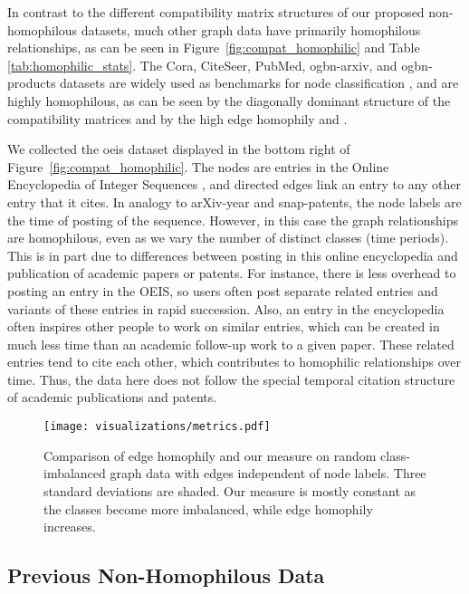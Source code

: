 \documentclass[sigconf, balance=false]{acmart}
\begin{document}
In contrast to the different compatibility matrix structures of our proposed non-homophilous datasets, much other graph data have primarily homophilous relationships, as can be seen in Figure~\ref{fig:compat_homophilic} and Table \ref{tab:homophilic_stats}. The Cora, CiteSeer, PubMed, ogbn-arxiv, and ogbn-products datasets are widely used as benchmarks for node classification \cite{yang2016revisiting, hu2020open}, and are highly homophilous, as can be seen by the diagonally dominant structure of the compatibility matrices and by the high edge homophily and .

We collected the oeis dataset displayed in the bottom right of Figure~\ref{fig:compat_homophilic}. The nodes are entries in the Online Encyclopedia of Integer Sequences \cite{sloane2007line}, and directed edges link an entry to any other entry that it cites. In analogy to arXiv-year and snap-patents, the node labels are the time of posting of the sequence. However, in this case the graph relationships are homophilous, even as we vary the number of distinct classes (time periods). This is in part due to differences between posting in this online encyclopedia and publication of academic papers or patents. For instance, there is less overhead to posting an entry in the OEIS, so users often post separate related entries and variants of these entries in rapid succession. Also, an entry in the encyclopedia often inspires other people to work on similar entries, which can be created in much less time than an academic follow-up work to a given paper. These related entries tend to cite each other, which contributes to homophilic relationships over time. Thus, the data here does not follow the special temporal citation structure of academic publications and patents.

\begin{figure}[ht!]
    \centering
    \texttt{[image: visualizations/metrics.pdf]}
    \caption{Comparison of edge homophily  and our measure  on random class-imbalanced graph data with edges independent of node labels. Three standard deviations are shaded. Our measure is mostly constant as the classes become more imbalanced, while edge homophily increases.}
    \label{fig:metrics}
\end{figure}

\subsection{Previous Non-Homophilous Data}
\end{document}
